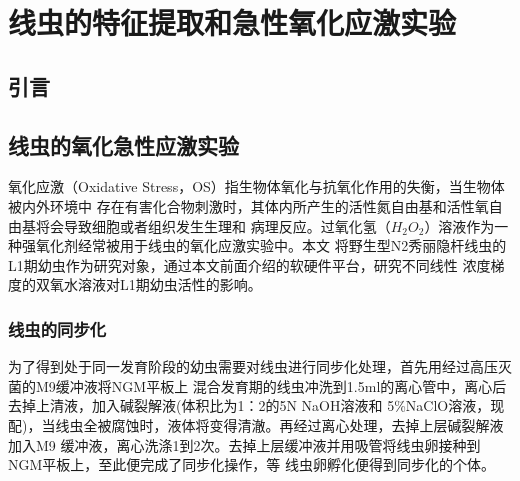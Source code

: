 \chapter{线虫的特征提取和急性氧化应激实验}
\section{引言}
\section{线虫的氧化急性应激实验}
	氧化应激（Oxidative Stress，OS）指生物体氧化与抗氧化作用的失衡，当生物体被内外环境中
	存在有害化合物刺激时，其体内所产生的活性氮自由基和活性氧自由基将会导致细胞或者组织发生生理和
	病理反应。过氧化氢（$H_2O_2$）溶液作为一种强氧化剂经常被用于线虫的氧化应激实验中。本文
	将野生型N2秀丽隐杆线虫的L1期幼虫作为研究对象，通过本文前面介绍的软硬件平台，研究不同线性
	浓度梯度的双氧水溶液对L1期幼虫活性的影响。
\subsection{线虫的同步化}
	为了得到处于同一发育阶段的幼虫需要对线虫进行同步化处理，首先用经过高压灭菌的M9缓冲液将NGM平板上
	混合发育期的线虫冲洗到1.5ml的离心管中，离心后去掉上清液，加入碱裂解液(体积比为1：2的5N NaOH溶液和
	5\%NaClO溶液，现配)，当线虫全被腐蚀时，液体将变得清澈。再经过离心处理，去掉上层碱裂解液加入M9
	缓冲液，离心洗涤1到2次。去掉上层缓冲液并用吸管将线虫卵接种到NGM平板上，至此便完成了同步化操作，等
	线虫卵孵化便得到同步化的个体。
